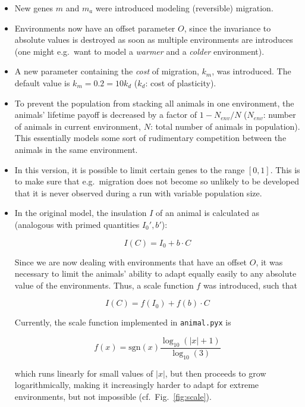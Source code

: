 \documentclass[
12pt, %
a4paper, %
headinclude,footinclude %
]{article}
\begin{document}
\begin{itemize}
\item New genes $m$ and $m_a$ were introduced modeling (reversible) migration.
\item Environments now have an offset parameter $O$, since the invariance to absolute values is destroyed as soon as multiple environments are introduces (one might e.g.~want to model a \emph{warmer} and a \emph{colder} environment).
\item A new parameter containing the \emph{cost} of migration, $k_m$, was introduced. The default value is $k_m = 0.2 = 10 k_d$ ($k_d$: cost of plasticity).
\item To prevent the population from stacking all animals in one environment, the animals' lifetime payoff is decreased by a factor of $1 - N_{env}/N$ ($N_{env}$: number of animals in current environment, $N$: total number of animals in population). This essentially models some sort of rudimentary competition between the animals in the same environment.
\item In this version, it is possible to limit certain genes to the range $[0,1]$. This is to make sure that e.g.~migration does not become so unlikely to be developed that it is never observed during a run with variable population size.
\item In the original model, the insulation $I$ of an animal is calculated as (analogous with primed quantities $I_0', b'$):

$$ I(C) = I_0 + b \cdot C $$

Since we are now dealing with environments that have an offset $O$, it was necessary to limit the animals' ability to adapt equally easily to any absolute value of the environments. Thus, a scale function $f$ was introduced, such that

$$ I(C) = f(I_0) + f(b) \cdot C $$

Currently, the scale function implemented in \verb|animal.pyx| is

$$ f(x) = \text{sgn}(x) \frac{ \log_{10} \left( |x| + 1 \right) }{ \log_{10}(3) }$$

which runs linearly for small values of $|x|$, but then proceeds to grow logarithmically, making it increasingly harder to adapt for extreme environments, but not impossible (cf.~Fig.~\ref{fig:scale}). 
\end{itemize}
\end{document}
